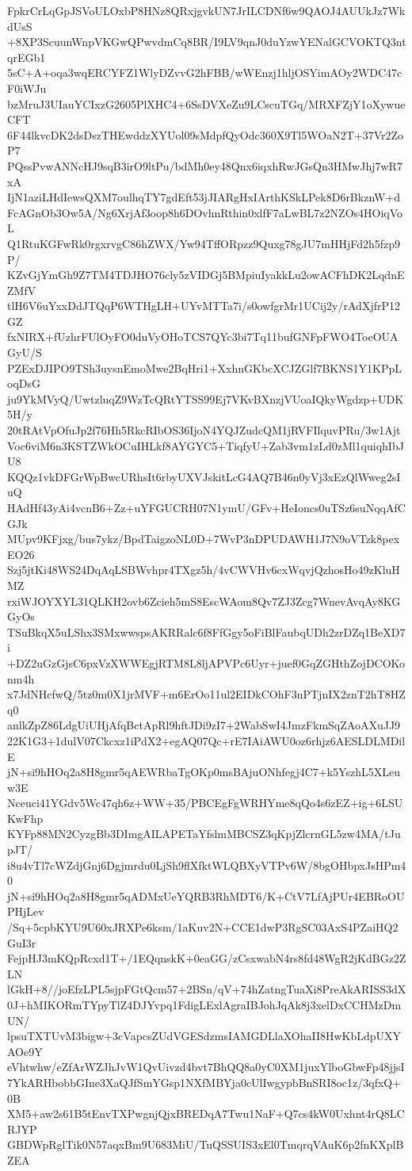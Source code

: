 FpkrCrLqGpJSVoULOxbP8HNz8QRxjgvkUN7JrILCDNf6w9QAOJ4AUUkJz7WkdUsS
+8XP3ScuunWnpVKGwQPwvdmCq8BR/I9LV9qnJ0duYzwYENalGCVOKTQ3ntqrEGb1
5sC+A+oqa3wqERCYFZ1WlyDZvvG2hFBB/wWEnzj1hljOSYimAOy2WDC47cF0iWJu
bzMruJ3UIauYCIxzG2605PlXHC4+6SsDVXeZu9LCscuTGq/MRXFZjY1oXywueCFT
6F44lkvcDK2dsDszTHEwddzXYUol09sMdpfQyOdc360X9Tl5WOaN2T+37Vr2ZoP7
PQssPvwANNcHJ9sqB3irO9ltPu/bdMh0ey48Qnx6iqxhRwJGsQn3HMwJhj7wR7xA
IjN1aziLHdIewsQXM7oulhqTY7gdEft53jJIARgHxIArthKSkLPek8D6rBkznW+d
FcAGnOb3Ow5A/Ng6XrjAf3oop8h6DOvhnRthin0xlfF7aLwBL7z2NZOs4HOiqVoL
Q1RtuKGFwRk0rgxrvgC86hZWX/Yw94TffORpzz9Quxg78gJU7mHHjFd2h5fzp9P/
KZvGjYmGh9Z7TM4TDJHO76cly5zVIDGj5BMpiuIyakkLu2owACFhDK2LqdnEZMfV
tlH6V6uYxxDdJTQqP6WTHgLH+UYvMTTa7i/s0owfgrMr1UCij2y/rAdXjfrP12GZ
fxNIRX+fUzhrFUlOyFO0duVyOHoTCS7QYc3bi7Tq11bufGNFpFWO4ToeOUAGyU/S
PZExDJIPO9TSh3uysnEmoMwe2BqHri1+XxhnGKbcXCJZGlf7BKNS1Y1KPpLoqDsG
ju9YkMVyQ/UwtzluqZ9WzTcQRtYTSS99Ej7VKvBXnzjVUoaIQkyWgdzp+UDK5H/y
20tRAtVpOfuJp2f76Hh5RkcRIbOS36IjoN4YQJZudcQM1jRVFIlquvPRu/3w1Ajt
Voc6viM6n3KSTZWkOCuIHLkf8AYGYC5+TiqfyU+Zab3vm1zLd0zMl1quiqhIbJU8
KQQz1vkDFGrWpBwcURhsIt6rbyUXVJskitLcG4AQ7B46n0yVj3xEzQlWweg2sIuQ
HAdHf43yAi4vcnB6+Zz+uYFGUCRH07N1ymU/GFv+HeIoncs0uTSz6suNqqAfCGJk
MUpv9KFjxg/bus7ykz/BpdTaigzoNL0D+7WvP3nDPUDAWH1J7N9oVTzk8pexEO26
Szj5jtKi48WS24DqAqLSBWvhpr4TXgz5h/4vCWVHv6cxWqvjQzhosHo49zKluHMZ
rxiWJOYXYL31QLKH2ovb6Zcieh5mS8EscWAom8Qv7ZJ3Zcg7WnevAvqAy8KGGyOs
TSuBkqX5uLShx3SMxwwspsAKRRalc6f8FfGgy5oFiBlFaubqUDh2zrDZq1BeXD7i
+DZ2uGzGjsC6pxVzXWWEgjRTM8L8ljAPVPc6Uyr+juef0GqZGHthZojDCOKonm4h
x7JdNHcfwQ/5tz0m0X1jrMVF+m6ErOo11ul2EIDkCOhF3nPTjnIX2znT2hT8HZq0
anlkZpZ86LdgUiUHjAfqBctApRl9hftJDi9zI7+2WabSwI4JmzFkmSqZAoAXuJJ9
22K1G3+1dulV07Ckcxz1iPdX2+egAQ07Qc+rE7IAiAWU0oz6rhjz6AESLDLMDilE
jN+si9hHOq2a8H8gmr5qAEWRbaTgOKp0msBAjuONhfegj4C7+k5YszhL5XLeuw3E
Nceuci41YGdv5Wc47qh6z+WW+35/PBCEgFgWRHYme8qQo4s6zEZ+ig+6LSUKwFhp
KYFp88MN2CyzgBb3DImgAILAPETaYfslmMBCSZ3qKpjZlcrnGL5zw4MA/tJupJT/
i8u4vTl7cWZdjGnj6Dgjmrdu0LjSh9flXfktWLQBXyVTPv6W/8bgOHbpxJsHPm40
jN+si9hHOq2a8H8gmr5qADMxUeYQRB3RhMDT6/K+CtV7LfAjPUr4EBRoOUPHjLev
/Sq+5cpbKYU9U60xJRXPe6ksm/1aKuv2N+CCE1dwP3RgSC03AxS4PZaiHQ2GuI3r
FejpHJ3mKQpRcxd1T+/1EQqnskK+0eaGG/zCsxwabN4rs8fd48WgR2jKdBGz2ZLN
lGkH+8//joEfzLPL5sjpFGtQcm57+2BSn/qV+74hZatngTuaXi8PreAkARISS3dX
0J+hMIKORmTYpyTlZ4DJYvpq1FdigLExlAgraIBJohJqAk8j3xelDxCCHMzDmUN/
lpsuTXTUvM3bigw+3cVapcsZUdVGESdzmsIAMGDLlaXOhaII8HwKbLdpUXYAOe9Y
eVhtwhw/eZfArWZJhJvW1QvUivzd4bvt7BhQQ8a0yC0XM1juxYlboGbwFp48jjsI
7YkARHbobbGIne3XaQJfSmYGsp1NXfMBYja0cUlIwgypbBnSRI8oc1z/3qfxQ+0B
XM5+aw2s61B5tEnvTXPwgnjQjxBREDqA7Twu1NaF+Q7cs4kW0Uxhnt4rQ8LCRJYP
GBDWpRglTik0N57aqxBm9U683MiU/TuQSSUIS3xEl0TmqrqVAuK6p2fnKXplBZEA
